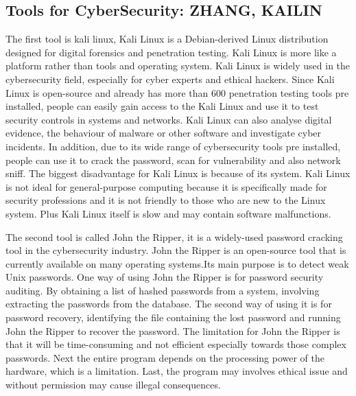 \documentclass[a4paper, 11pt]{report}
\begin{document}
\subsection{Tools for CyberSecurity: ZHANG, KAILIN }
The first tool is kali linux, Kali Linux is a Debian-derived Linux distribution designed for digital forensics and penetration testing. Kali Linux is more like a platform rather than tools and operating system. Kali Linux is widely used in the cybersecurity field, especially for cyber experts and ethical hackers.
Since Kali Linux is open-source and already has more than 600 penetration testing tools pre installed, people can easily gain access to the Kali Linux and use it to test security controls in systems and networks. Kali Linux can also analyse digital evidence, the behaviour of malware or other software and investigate cyber incidents. In addition, due to its wide range of cybersecurity tools pre installed, people can use it to crack the password, scan for vulnerability and also network sniff.
The biggest disadvantage for Kali Linux is because of its system. Kali Linux is not ideal for general-purpose computing because it is specifically made for security professions and it is not friendly to those who are new to the Linux system. Plus Kali Linux itself is slow and may contain software malfunctions.

The second tool is called John the Ripper, it is a widely-used password cracking tool in the cybersecurity industry. John the Ripper is an open-source tool that is currently available on many operating systems.Its main purpose is to detect weak Unix passwords.
One way of using John the Ripper is for password security auditing. By obtaining a list of hashed passwords from a system, involving extracting the passwords from the database. The second way of using it is for password recovery, identifying the file containing the lost password and running John the Ripper to recover the password.
The limitation for John the Ripper is that it will be time-consuming and not efficient especially towards those complex passwords. Next the entire program depends on the processing power of the hardware, which is a limitation. Last, the program may involves ethical issue and without permission may cause illegal consequences.












\end{document}
